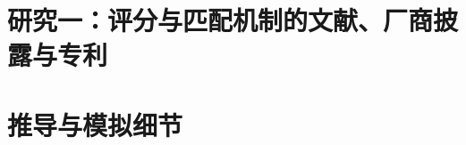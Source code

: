 \documentclass[a4paper,zihao=-4,openany]{ctexrep}
\begin{document}
\setcounter{chapter}{0}
\chapter{研究一：评分与匹配机制的文献、厂商披露与专利}\label{ch:lit}
\printbibliography[heading=bibintoc,title=参考文献]
\appendix
\chapter{推导与模拟细节}

\end{document}
